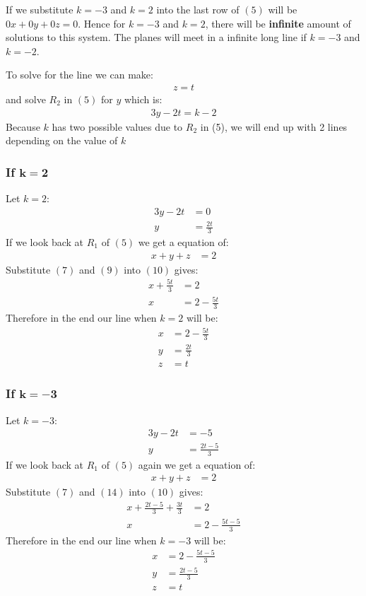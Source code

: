\documentclass[12pt]{article}
\begin{document}
If we substitute  $k = -3$ and $k =2$ into the last row of $(5)$
will be $0x + 0y + 0z = 0$. Hence for  $k = -3$ and $k =2$, there will be {\bf infinite} amount of solutions to this system. The planes will meet in a infinite long line if $k = -3$ and $k =-2$.

To solve for the line we can make:
\begin{align}
z=t
\end{align}
and solve $R_2$ in $(5)$ for $y$ which is:
\begin{align*}
3y-2t=k-2
\end{align*}
Because $k$ has two possible values due to $R_2$ in (5), we will end up with 2 lines depending on the value of $k$ \\
\subsubsection{If $\bm{k=2}$}
Let $k = 2$:
\begin{align}
3y-2t&=0 \\
y&=\frac{2t}{3}
\end{align}
If we look back at $R_1$ of $(5)$ we get a equation of:
\begin{align}
x+y+z&=2
\end{align}
Substitute $(7)$ and $(9)$ into $(10)$ gives:
\begin{align}
x+\frac{5t}{3}&=2 \\
x&= 2 -\frac{5t}{3}
\end{align}
Therefore in the end our line when $k = 2$ will be:
\begin{align*}
x&=2-\frac{5t}{3} \\
y&=\frac{2t}{3} \\ 
z&=t
\end{align*}

\newpage

\subsubsection{If $\bm{k=-3}$}
Let $k = -3$:
\begin{align}
3y-2t&=-5 \\
y&=\frac{2t-5}{3}
\end{align}
If we look back at $R_1$ of $(5)$ again we get a equation of:
\begin{align*}
x+y+z&=2
\end{align*}
Substitute $(7)$ and $(14)$ into $(10)$ gives:
\begin{align}
x+\frac{2t-5}{3}+\frac{3t}{3}&=2 \\
x&= 2 -\frac{5t-5}{3}
\end{align}
Therefore in the end our line when $k = -3$ will be:
\begin{align*}
x&=2-\frac{5t-5}{3} \\
y&=\frac{2t-5}{3} \\ 
z&=t
\end{align*}
\end{document}
